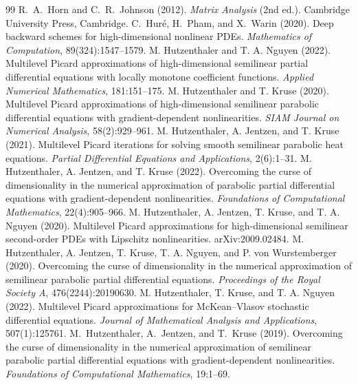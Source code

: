 \documentclass[11pt]{article}
\theoremstyle{definition}
\theoremstyle{plain}
\begin{document}
\begin{singlespace}
\begin{thebibliography}{99}
R.~A.~Horn and C.~R.~Johnson (2012).
\emph{Matrix Analysis} (2nd ed.).
Cambridge University Press, Cambridge.
   C.~Hur\'e, H.~Pham, and X.~Warin (2020). \newblock Deep backward schemes for high-dimensional nonlinear PDEs. \newblock \emph{Mathematics of Computation}, 89(324):1547--1579.
   M. Hutzenthaler and T. A. Nguyen (2022). \newblock Multilevel Picard approximations of high-dimensional semilinear partial differential equations with locally monotone coefficient functions. \newblock \emph{Applied Numerical Mathematics}, 181:151--175.
   M. Hutzenthaler and T. Kruse (2020). \newblock Multilevel Picard approximations of high-dimensional semilinear parabolic differential equations with gradient-dependent nonlinearities. \newblock \emph{SIAM Journal on Numerical Analysis}, 58(2):929--961.
   M. Hutzenthaler, A. Jentzen, and T. Kruse (2021). \newblock Multilevel Picard iterations for solving smooth semilinear parabolic heat equations. \newblock \emph{Partial Differential Equations and Applications}, 2(6):1--31.
   M. Hutzenthaler, A. Jentzen, and T. Kruse (2022). \newblock Overcoming the curse of dimensionality in the numerical approximation of parabolic partial differential equations with gradient-dependent nonlinearities. \newblock \emph{Foundations of Computational Mathematics}, 22(4):905--966.
   M. Hutzenthaler, A. Jentzen, T. Kruse, and T. A. Nguyen (2020). \newblock Multilevel Picard approximations for high-dimensional semilinear second-order PDEs with Lipschitz nonlinearities. \newblock arXiv:2009.02484.
   M. Hutzenthaler, A. Jentzen, T. Kruse, T. A. Nguyen, and P. von Wurstemberger (2020). \newblock Overcoming the curse of dimensionality in the numerical approximation of semilinear parabolic partial differential equations. \newblock \emph{Proceedings of the Royal Society A}, 476(2244):20190630.
   M. Hutzenthaler, T. Kruse, and T. A. Nguyen (2022). \newblock Multilevel Picard approximations for McKean--Vlasov stochastic differential equations. \newblock \emph{Journal of Mathematical Analysis and Applications}, 507(1):125761.
   M.~Hutzenthaler, A.~Jentzen, and T.~Kruse (2019). \newblock Overcoming the curse of dimensionality in the numerical approximation of semilinear parabolic partial differential equations with gradient-dependent nonlinearities. \newblock \emph{Foundations of Computational Mathematics}, 19:1--69. %

\end{thebibliography}
\end{singlespace}
\end{document}
